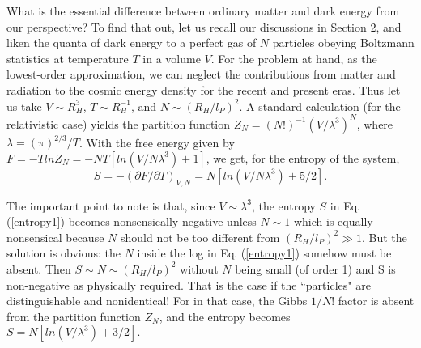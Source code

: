 \documentclass[a4paper]{jpconf}
\begin{document}
What is the essential difference between ordinary matter and
dark energy from our perspective?
To find that out, let us recall our discussions in Section 2, and liken
the quanta of dark energy to
a perfect gas of $N$ particles obeying Boltzmann statistics
at temperature $T$ in a volume $V$.  For the
problem at hand, as the lowest-order approximation, we can neglect the
contributions from matter and radiation to the cosmic 
energy density for the recent and present eras.  
Thus let us take $V \sim R_H^3$, $T \sim R_H^{-1}$, and $N \sim
(R_H/ l_P)^2$. A standard calculation (for the relativistic case) yields the
partition function $Z_N = (N!)^{-1} (V / \lambda^3)^N$, where
$\lambda = (\pi)^{2/3} /T$.
With the free energy given by
$F = -T ln Z_N = -N T [ ln (V/ N \lambda^3) + 1]$,
we get, for the entropy of the system,
\begin{equation}
S = - ( \partial F / \partial T)_{V,N} = N [ln (V / N \lambda^3) + 5/2].
\label{entropy1}
\end{equation}

The important point to note is that, since $V \sim \lambda^3$, the entropy
$S$ in Eq. (\ref{entropy1}) becomes nonsensically negative unless $ N \sim
1$ which is equally nonsensical because $N$ should not be too different from
$(R_H/l_P)^2 \gg 1$.
But the solution \cite{plb} 
is obvious: the $N$ inside the log in Eq. (\ref{entropy1}) somehow
must be absent.  Then $ S \sim N
\sim (R_H/l_P)^2$ without $N$ being small (of order 1) and S is non-negative
as physically required.  That is the case if the ``particles" are
distinguishable and nonidentical!  For in that case, the Gibbs $1/N!$ factor
is absent from the partition function $Z_N$, and the entropy becomes
$
S = N[ln (V/ \lambda^3) + 3/2].
$
\\
\end{document}
